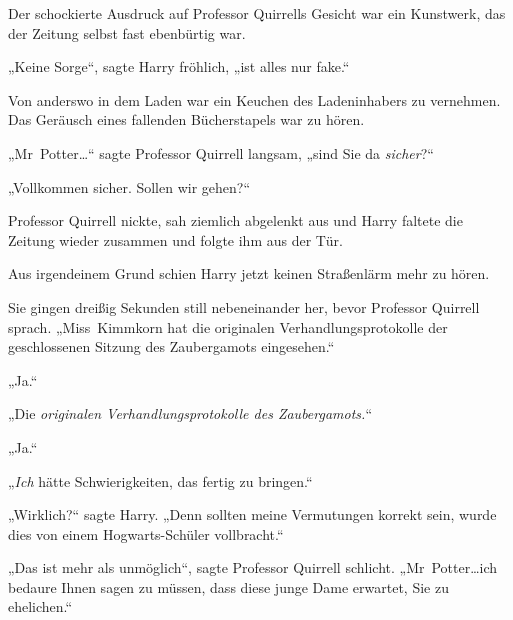 Der schockierte Ausdruck auf Professor Quirrells Gesicht war ein Kunstwerk, das der Zeitung selbst fast ebenbürtig war.

„Keine Sorge“, sagte Harry fröhlich, „ist alles nur fake.“

Von anderswo in dem Laden war ein Keuchen des Ladeninhabers zu vernehmen. Das Geräusch eines fallenden Bücherstapels war zu hören.

„Mr~Potter…“ sagte Professor Quirrell langsam, „sind Sie da \emph{sicher}?“

„Vollkommen sicher. Sollen wir gehen?“

Professor Quirrell nickte, sah ziemlich abgelenkt aus und Harry faltete die Zeitung wieder zusammen und folgte ihm aus der Tür.

Aus irgendeinem Grund schien Harry jetzt keinen Straßenlärm mehr zu hören.

Sie gingen dreißig Sekunden still nebeneinander her, bevor Professor Quirrell sprach. „Miss~Kimmkorn hat die originalen Verhandlungsprotokolle der geschlossenen Sitzung des Zaubergamots eingesehen.“

„Ja.“

„Die \emph{originalen Verhandlungsprotokolle des Zaubergamots.}“

„Ja.“

„\emph{Ich} hätte Schwierigkeiten, das fertig zu bringen.“

„Wirklich?“ sagte Harry. „Denn sollten meine Vermutungen korrekt sein, wurde dies von einem Hogwarts-Schüler vollbracht.“

„Das ist mehr als unmöglich“, sagte Professor Quirrell schlicht. „Mr~Potter…ich bedaure Ihnen sagen zu müssen, dass diese junge Dame erwartet, Sie zu ehelichen.“

